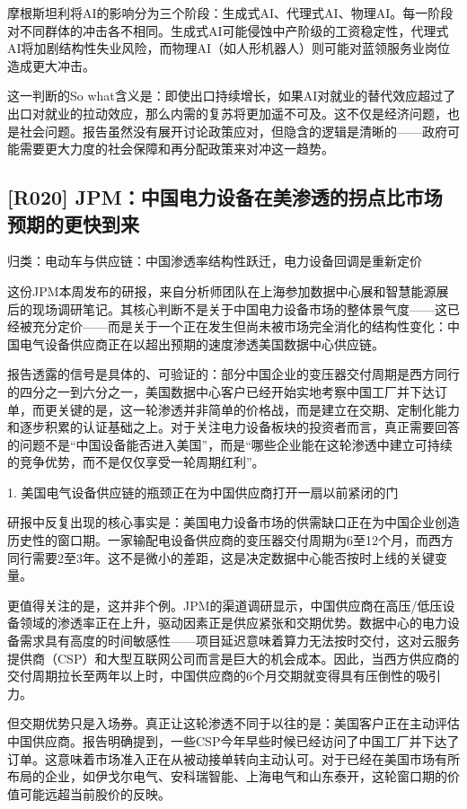 \documentclass[11pt]{ctexart}
\begin{document}
摩根斯坦利将AI的影响分为三个阶段：生成式AI、代理式AI、物理AI。每一阶段对不同群体的冲击各不相同。生成式AI可能侵蚀中产阶级的工资稳定性，代理式AI将加剧结构性失业风险，而物理AI（如人形机器人）则可能对蓝领服务业岗位造成更大冲击。

这一判断的So what含义是：即使出口持续增长，如果AI对就业的替代效应超过了出口对就业的拉动效应，那么内需的复苏将更加遥不可及。这不仅是经济问题，也是社会问题。报告虽然没有展开讨论政策应对，但隐含的逻辑是清晰的——政府可能需要更大力度的社会保障和再分配政策来对冲这一趋势。

\subsection{[R020] JPM：中国电力设备在美渗透的拐点比市场预期的更快到来}
{\small\color{refgray}归类：电动车与供应链：中国渗透率结构性跃迁，电力设备回调是重新定价}

这份JPM本周发布的研报，来自分析师团队在上海参加数据中心展和智慧能源展后的现场调研笔记。其核心判断不是关于中国电力设备市场的整体景气度——这已经被充分定价——而是关于一个正在发生但尚未被市场完全消化的结构性变化：中国电气设备供应商正在以超出预期的速度渗透美国数据中心供应链。

报告透露的信号是具体的、可验证的：部分中国企业的变压器交付周期是西方同行的四分之一到六分之一，美国数据中心客户已经开始实地考察中国工厂并下达订单，而更关键的是，这一轮渗透并非简单的价格战，而是建立在交期、定制化能力和逐步积累的认证基础之上。对于关注电力设备板块的投资者而言，真正需要回答的问题不是“中国设备能否进入美国”，而是“哪些企业能在这轮渗透中建立可持续的竞争优势，而不是仅仅享受一轮周期红利”。

1. 美国电气设备供应链的瓶颈正在为中国供应商打开一扇以前紧闭的门

研报中反复出现的核心事实是：美国电力设备市场的供需缺口正在为中国企业创造历史性的窗口期。一家输配电设备供应商的变压器交付周期为6至12个月，而西方同行需要2至3年。这不是微小的差距，这是决定数据中心能否按时上线的关键变量。

更值得关注的是，这并非个例。JPM的渠道调研显示，中国供应商在高压/低压设备领域的渗透率正在上升，驱动因素正是供应紧张和交期优势。数据中心的电力设备需求具有高度的时间敏感性——项目延迟意味着算力无法按时交付，这对云服务提供商（CSP）和大型互联网公司而言是巨大的机会成本。因此，当西方供应商的交付周期拉长至两年以上时，中国供应商的6个月交期就变得具有压倒性的吸引力。

但交期优势只是入场券。真正让这轮渗透不同于以往的是：美国客户正在主动评估中国供应商。报告明确提到，一些CSP今年早些时候已经访问了中国工厂并下达了订单。这意味着市场准入正在从被动接单转向主动认可。对于已经在美国市场有所布局的企业，如伊戈尔电气、安科瑞智能、上海电气和山东泰开，这轮窗口期的价值可能远超当前股价的反映。
\end{document}
